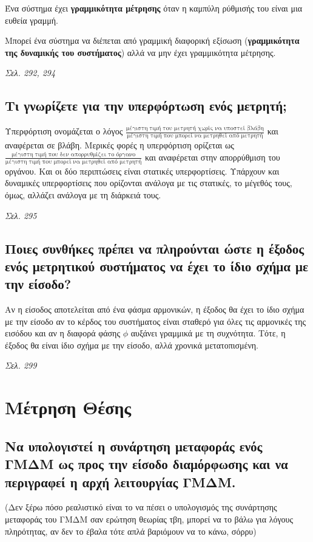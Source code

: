\documentclass{article}
\begin{document}
Ένα σύστημα έχει \textbf{γραμμικότητα μέτρησης} όταν η καμπύλη ρύθμισής του είναι μια ευθεία γραμμή.

Μπορεί ένα σύστημα να διέπεται από γραμμική διαφορική εξίσωση (\textbf{γραμμικότητα της δυναμικής του συστήματος}) αλλά να μην έχει γραμμικότητα μέτρησης.

\emph{Σελ. 292, 294}
\subsection{Τι γνωρίζετε για την υπερφόρτωση ενός μετρητή;}
Υπερφόρτιση ονομάζεται ο λόγος $\frac{\text{μέγιστη τιμή του μετρητή χωρίς να υποστεί βλάβη}}{\text{μέγιστη τιμή που μπορεί να μετρηθεί από μετρητή}}$ και αναφέρεται σε βλάβη. 
Μερικές φορές η υπερφόρτιση ορίζεται ως $\frac{\text{μέγιστη τιμή που δεν απορρυθμίζει το όργανο}}{\text{μέγιστη τιμή που μπορεί να μετρηθεί από μετρητή}}$ και αναφέρεται 
στην απορρύθμιση του οργάνου. Και οι δύο περιπτώσεις είναι στατικές υπερφορτίσεις. Υπάρχουν και δυναμικές υπερφορτίσεις που ορίζονται ανάλογα με τις στατικές, το μέγεθός
τους, όμως, αλλάζει ανάλογα με τη διάρκειά τους.


\emph{Σελ. 295}
\subsection{Ποιες συνθήκες πρέπει να πληρούνται ώστε η έξοδος ενός μετρητικού συστήματος να έχει το ίδιο σχήμα με την είσοδο?}
Αν η είσοδος αποτελείται από ένα φάσμα αρμονικών, η έξοδος θα έχει το ίδιο σχήμα με την είσοδο αν το κέρδος του συστήματος είναι σταθερό για
όλες τις αρμονικές της εισόδου και αν η διαφορά φάσης $\phi$ αυξάνει γραμμικά με τη συχνότητα. Τότε, η έξοδος θα είναι ίδιο σχήμα με την είσοδο,
αλλά χρονικά μετατοπισμένη. 

\emph{Σελ. 299}

\section{Μέτρηση Θέσης}
\subsection{Να υπολογιστεί η συνάρτηση μεταφοράς ενός ΓΜΔΜ ως προς την είσοδο διαμόρφωσης και να περιγραφεί η αρχή λειτουργίας ΓΜΔΜ.}
(Δεν ξέρω πόσο ρεαλιστικό είναι το να πέσει ο υπολογισμός της συνάρτησης μεταφοράς του ΓΜΔΜ σαν ερώτηση θεωρίας τβη, μπορεί να το βάλω για λόγους πληρότητας, αν δεν το έβαλα τότε
απλά βαριόμουν να το κάνω, σόρρυ)
\end{document}
